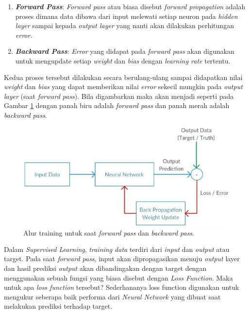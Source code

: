 \begin{enumerate}[label=\textbf{\alph*.}]
	\item \textbf{\textit{Forward Pass}}: \textit{Forward pass} atau biasa disebut \textit{forward propagation} adalah proses dimana data dibawa dari input melewati setiap neuron pada \textit{hidden layer} sampai kepada \textit{output layer} yang nanti akan dilakukan perhitungan \textit{error}.
	\
	\item \textbf{\textit{Backward Pass}}: \textit{Error} yang didapat pada \textit{forward pass} akan digunakan untuk mengupdate setiap \textit{weight} dan \textit{bias} dengan \textit{learning rate} tertentu.
\end{enumerate}

Kedua proses tersebut dilakukan secara berulang-ulang sampai didapatkan nilai \textit{weight} dan \textit{bias} yang dapat memberikan nilai \textit{error} sekecil mungkin pada \textit{output layer} (saat \textit{forward pass}). Bila digambarkan maka akan menjadi seperti pada Gambar \ref{fig:ann_backpro} dengan panah biru adalah \textit{forward pass} dan panah merah adalah \textit{backward pass}.
\vspace{1ex}

\begin{figure} [!h] \centering
	\includegraphics[scale=0.8]{img/ann_backpro.jpeg}
	\caption{Alur training untuk saat \textit{forward pass} dan \textit{backward pass}.}
	\label{fig:ann_backpro}
\end{figure}

Dalam \textit{Supervised Learning}, \textit{training data} terdiri dari \textit{input} dan \textit{output} atau target. Pada saat \textit{forward pass}, input akan dipropagasikan menuju \textit{output} layer dan hasil prediksi \textit{output} akan dibandingakan dengan target dengan menggunakan sebuah fungsi yang biasa disebut dengan \textit{Loss Function}. Maka untuk apa \textit{loss function} tersebut? Sederhananya loss function digunakan untuk mengukur seberapa baik performa dari \textit{Neural Network} yang dibuat saat melakukan prediksi terhadap target.
\vspace{1ex}

